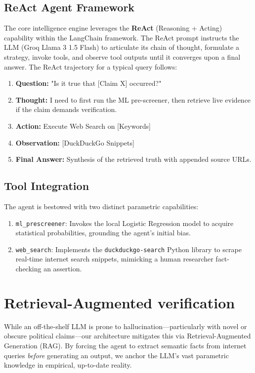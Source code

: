 \documentclass[12pt, a4paper]{article}
\begin{document}
\subsection{ReAct Agent Framework}
The core intelligence engine leverages the \textbf{ReAct} (Reasoning + Acting) capability within the LangChain framework. The ReAct prompt instructs the LLM (Groq Llama 3 1.5 Flash) to articulate its chain of thought, formulate a strategy, invoke tools, and observe tool outputs until it converges upon a final answer. The ReAct trajectory for a typical query follows:
\begin{enumerate}
    \item \textbf{Question:} "Is it true that [Claim X] occurred?"
    \item \textbf{Thought:} I need to first run the ML pre-screener, then retrieve live evidence if the claim demands verification.
    \item \textbf{Action:} Execute Web Search on [Keywords]
    \item \textbf{Observation:} [DuckDuckGo Snippets]
    \item \textbf{Final Answer:} Synthesis of the retrieved truth with appended source URLs.
\end{enumerate}

\subsection{Tool Integration}
The agent is bestowed with two distinct parametric capabilities:
\begin{enumerate}
    \item \texttt{ml\_prescreener}: Invokes the local Logistic Regression model to acquire statistical probabilities, grounding the agent's initial bias.
    \item \texttt{web\_search}: Implements the \texttt{duckduckgo-search} Python library to scrape real-time internet search snippets, mimicking a human researcher fact-checking an assertion.
\end{enumerate}

\section{Retrieval-Augmented verification}

While an off-the-shelf LLM is prone to hallucination—particularly with novel or obscure political claims—our architecture mitigates this via Retrieval-Augmented Generation (RAG). By forcing the agent to extract semantic facts from internet queries \textit{before} generating an output, we anchor the LLM's vast parametric knowledge in empirical, up-to-date reality. 
\end{document}
